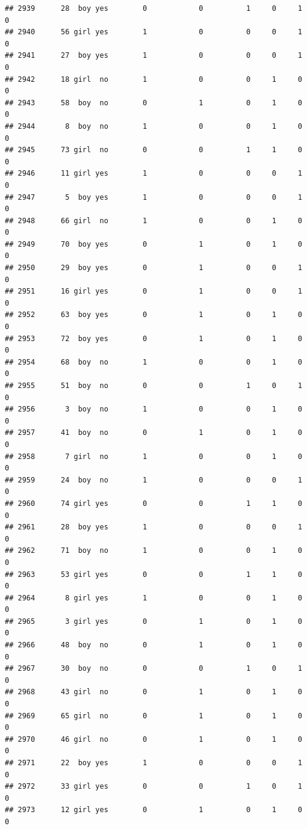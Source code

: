 \documentclass[man]{apa6}
\begin{document}
\begin{verbatim}
## 2939      28  boy yes        0            0          1     0     1     0
## 2940      56 girl yes        1            0          0     0     1     0
## 2941      27  boy yes        1            0          0     0     1     0
## 2942      18 girl  no        1            0          0     1     0     0
## 2943      58  boy  no        0            1          0     1     0     0
## 2944       8  boy  no        1            0          0     1     0     0
## 2945      73 girl  no        0            0          1     1     0     0
## 2946      11 girl yes        1            0          0     0     1     0
## 2947       5  boy yes        1            0          0     0     1     0
## 2948      66 girl  no        1            0          0     1     0     0
## 2949      70  boy yes        0            1          0     1     0     0
## 2950      29  boy yes        0            1          0     0     1     0
## 2951      16 girl yes        0            1          0     0     1     0
## 2952      63  boy yes        0            1          0     1     0     0
## 2953      72  boy yes        0            1          0     1     0     0
## 2954      68  boy  no        1            0          0     1     0     0
## 2955      51  boy  no        0            0          1     0     1     0
## 2956       3  boy  no        1            0          0     1     0     0
## 2957      41  boy  no        0            1          0     1     0     0
## 2958       7 girl  no        1            0          0     1     0     0
## 2959      24  boy  no        1            0          0     0     1     0
## 2960      74 girl yes        0            0          1     1     0     0
## 2961      28  boy yes        1            0          0     0     1     0
## 2962      71  boy  no        1            0          0     1     0     0
## 2963      53 girl yes        0            0          1     1     0     0
## 2964       8 girl yes        1            0          0     1     0     0
## 2965       3 girl yes        0            1          0     1     0     0
## 2966      48  boy  no        0            1          0     1     0     0
## 2967      30  boy  no        0            0          1     0     1     0
## 2968      43 girl  no        0            1          0     1     0     0
## 2969      65 girl  no        0            1          0     1     0     0
## 2970      46 girl  no        0            1          0     1     0     0
## 2971      22  boy yes        1            0          0     0     1     0
## 2972      33 girl yes        0            0          1     0     1     0
## 2973      12 girl yes        0            1          0     1     0     0

\end{verbatim}
\end{document}
